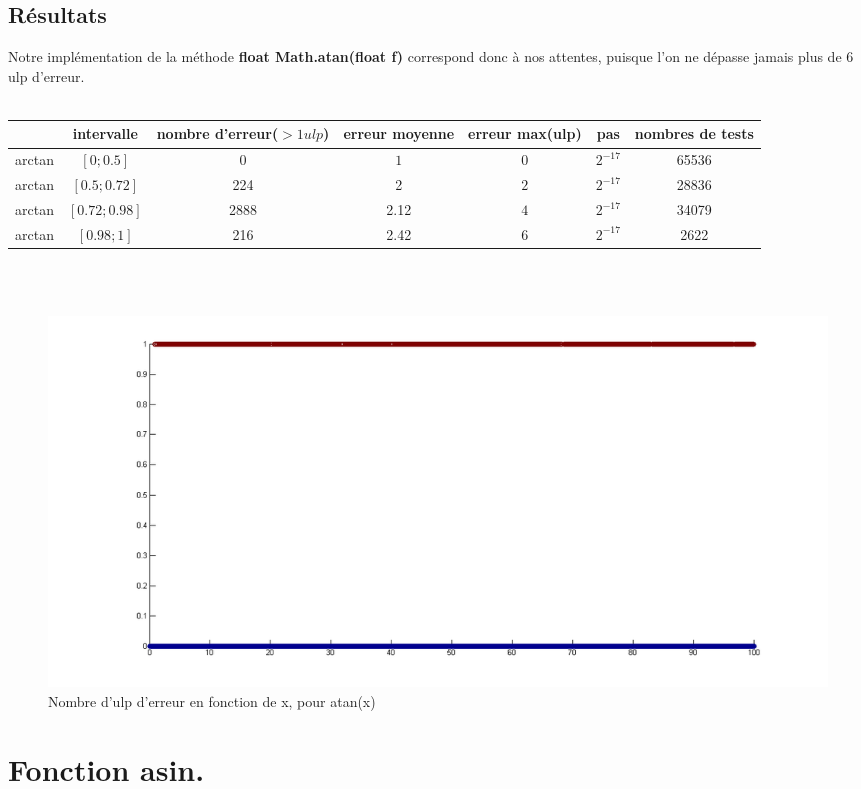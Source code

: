 \documentclass[a4,12pt]{article}
\begin{document}
\subsection{Résultats}
Notre implémentation de la méthode \textbf{float Math.atan(float f)} correspond donc à nos attentes, puisque l'on ne dépasse jamais plus de 6 ulp d'erreur.\\
\\

\hspace{-4cm}
\begin{tabular}{|c|c|c|c|c|c|c|}

\hline 
 & intervalle & nombre d'erreur($ > 1 ulp$) & erreur moyenne & erreur max(ulp) & pas & nombres de tests \\
\hline 
arctan & $[0;0.5]$ & 0 & $1$ & 0 &$2^{-17}$ & 65536\\
\hline
arctan & $[0.5;0.72]$ & 224 & 2 &$2$ & $2^{-17}$ & 28836\\
\hline
arctan & $[0.72;0.98]$ & 2888 & 2.12 &$4$ & $2^{-17}$ & 34079\\
\hline
arctan & $[0.98;1]$ & 216 & 2.42 &$6$ & $2^{-17}$ & 2622\\
\hline
\end{tabular}
\\
\\

\hspace{-4cm}
\begin{figure}[h!]
    \centering
    \includegraphics[scale=0.5]{atan100}
    \caption{Nombre d'ulp d'erreur en fonction de x, pour atan(x)}
    \label{fig:my_label}
\end{figure}


\section{Fonction asin.}
\end{document}
